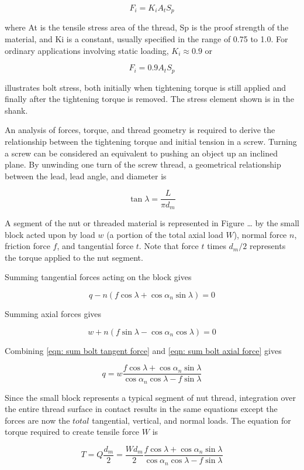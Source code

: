 \documentclass[a4paper,openany,12pt]{book}
\begin{document}
{{$$F_i = K_iA_tS_p$$

where At is the tensile stress area of the thread, Sp is the proof
strength of the material, and Ki is a constant, usually specified in the
range of 0.75 to 1.0. For ordinary applications involving static
loading, \(K_i \approx 0.9\) or

$$F_i = 0.9A_tS_p$$

illustrates bolt stress, both initially when tightening torque is still
applied and finally after the tightening torque is removed. The stress
element shown is in the shank.


An analysis of forces, torque, and thread geometry is required to derive
the relationship between the tightening torque and initial tension in a
screw. Turning a screw can be considered an equivalent to pushing an
object up an inclined plane. By unwinding one turn of the screw thread,
a geometrical relationship between the lead, lead angle, and diameter is

$$\tan \lambda  = \frac{L}{\pi d_m}$$

A segment of the nut or threaded material is represented in Figure \ldots{}
by the small block acted upon by load \(w\) (a portion of the total axial
load \(W\)), normal force \(n\), friction force \(f\), and tangential force
\(t\). Note that force \(t\) times \(d_m/2\) represents the torque applied to
the nut segment.

Summing tangential forces acting on the block gives

$$q - n(f\cos \lambda  + \cos \alpha_n\sin \lambda ) = 0$$

Summing axial forces gives

$$w + n(f\sin \lambda  - \cos \alpha_n\cos \lambda ) = 0$$

Combining
\ref{eqn: sum bolt tangent force} and \ref{eqn: sum bolt axial force} gives

$$q = w\frac{f\cos \lambda + \cos \alpha_n\sin \lambda }{\cos \alpha_n\cos \lambda  - f\sin \lambda }$$

Since the small block represents a typical segment of nut thread,
integration over the entire thread surface in contact results in the
same equations except the forces are now the \(total\) tangential,
vertical, and normal loads. The equation for torque required to create
tensile force \(W\) is

$$T = Q\frac{d_m}{2} = \frac{Wd_m}{2}\frac{f\cos \lambda + \cos \alpha_n\sin \lambda }{\cos \alpha_n\cos \lambda - f\sin \lambda }$$

}}
\end{document}
